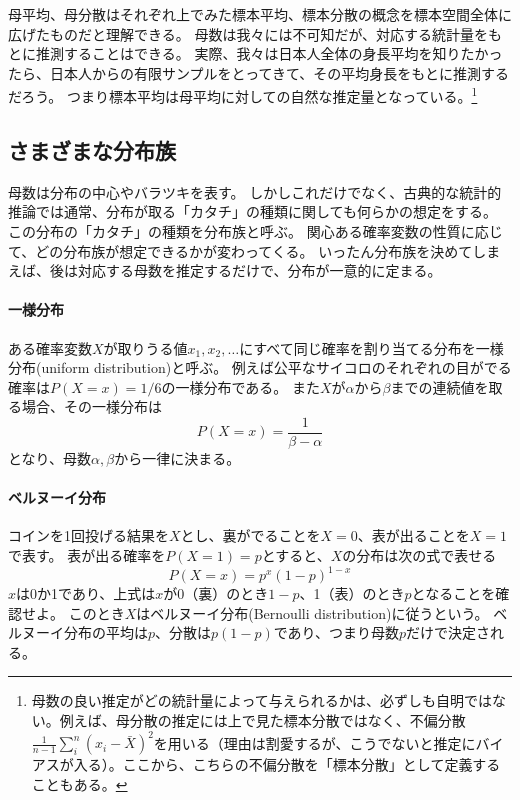 \documentclass{jsarticle}
\begin{document}
母平均、母分散はそれぞれ上でみた標本平均、標本分散の概念を標本空間全体に広げたものだと理解できる。
母数は我々には不可知だが、対応する統計量をもとに推測することはできる。
実際、我々は日本人全体の身長平均を知りたかったら、日本人からの有限サンプルをとってきて、その平均身長をもとに推測するだろう。
つまり標本平均は母平均に対しての自然な推定量となっている。\footnote{母数の良い推定がどの統計量によって与えられるかは、必ずしも自明ではない。例えば、母分散の推定には上で見た標本分散ではなく、不偏分散 $\frac{1}{n-1} \sum_i^n (x_i - \bar{X})^2$を用いる（理由は割愛するが、こうでないと推定にバイアスが入る）。ここから、こちらの不偏分散を「標本分散」として定義することもある。}



\subsection{さまざまな分布族}
母数は分布の中心やバラツキを表す。
しかしこれだけでなく、古典的な統計的推論では通常、分布が取る「カタチ」の種類に関しても何らかの想定をする。
この分布の「カタチ」の種類を分布族と呼ぶ。
関心ある確率変数の性質に応じて、どの分布族が想定できるかが変わってくる。
いったん分布族を決めてしまえば、後は対応する母数を推定するだけで、分布が一意的に定まる。

\paragraph{一様分布 \\}
ある確率変数$X$が取りうる値$x_1, x_2, \dots$にすべて同じ確率を割り当てる分布を一様分布(uniform distribution)と呼ぶ。
例えば公平なサイコロのそれぞれの目がでる確率は$P(X=x)=1/6$の一様分布である。
また$X$が$\alpha$から$\beta$までの連続値を取る場合、その一様分布は
\[
 P(X=x) = \frac{1}{\beta - \alpha}
\]
となり、母数$\alpha, \beta$から一律に決まる。


\paragraph{ベルヌーイ分布 \\}
コインを1回投げる結果を$X$とし、裏がでることを$X=0$、表が出ることを$X=1$で表す。
表が出る確率を$P(X=1)=p$とすると、$X$の分布は次の式で表せる
\[
 P(X=x) = p^x (1-p)^{1-x} 
\]
$x$は0か1であり、上式は$x$が0（裏）のとき$1-p$、1（表）のとき$p$となることを確認せよ。
このとき$X$はベルヌーイ分布(Bernoulli distribution)に従うという。
ベルヌーイ分布の平均は$p$、分散は$p(1-p)$であり、つまり母数$p$だけで決定される。
\end{document}
